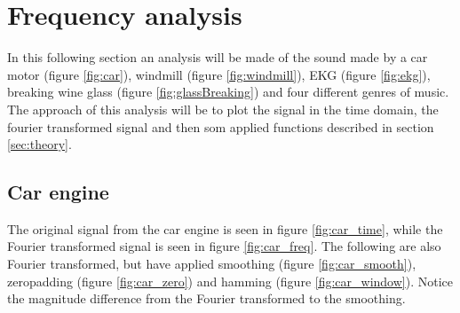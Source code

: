 \section{Frequency analysis}
\label{sec:analysis}

In this following section an analysis will be made of the sound made by a car motor (figure \ref{fig:car}), windmill (figure \ref{fig:windmill}), EKG (figure \ref{fig:ekg}), breaking wine glass (figure \ref{fig:glassBreaking}) and four different genres of music. 
The approach of this analysis will be to plot the signal in the time domain, the fourier transformed signal and then som applied functions described in section \ref{sec:theory}.


\subsection{Car engine}

The original signal from the car engine is seen in figure \ref{fig:car_time}, while the Fourier transformed signal is seen in figure \ref{fig:car_freq}. The following are also Fourier transformed, but have applied smoothing (figure \ref{fig:car_smooth}), zeropadding (figure \ref{fig:car_zero}) and hamming (figure \ref{fig:car_window}). Notice the magnitude difference from the Fourier transformed to the smoothing.

